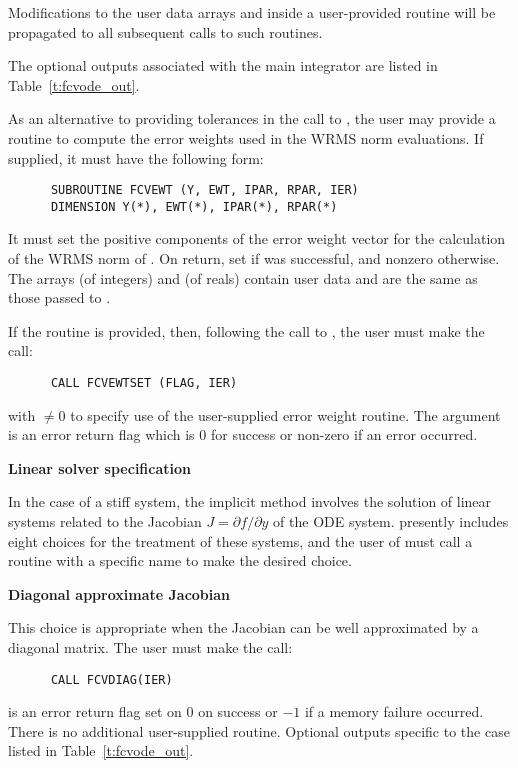 \begin{Steps}
{    Modifications to the user data arrays  and  inside a 
    user-provided routine will be propagated to all subsequent calls to
    such routines.

    The optional outputs associated with the main {\cvode} integrator
    are listed in Table~\ref{t:fcvode_out}.
  }

  As an alternative to providing tolerances in the call to , the
  user may provide a routine to compute the error weights used in the WRMS norm
  evaluations. If supplied, it must have the following form:
\begin{verbatim}
      SUBROUTINE FCVEWT (Y, EWT, IPAR, RPAR, IER)
      DIMENSION Y(*), EWT(*), IPAR(*), RPAR(*)
\end{verbatim}
  It must set the positive components of the error weight vector  for
  the calculation of the WRMS norm of . On return, set
   if  was successful, and nonzero otherwise.
  The arrays  (of integers) and  (of reals) contain user data
  and are the same as those passed to .

  If the  routine is provided, then, 
  following the call to , the user must make the call:
\begin{verbatim}
      CALL FCVEWTSET (FLAG, IER)
\end{verbatim}
  with  $\neq 0$ to specify use of the user-supplied error weight routine.
  The argument  is an error return flag which is $0$ 
  for success or non-zero if an error occurred.

\item\label{i:fcvode_lin_solv_spec} {\bf Linear solver specification} 
  
  In the case of a stiff system, the implicit  method involves the solution
  of linear systems related to the Jacobian $J = \partial f / \partial y$
  of the ODE system.  {\cvode} presently includes eight choices for the treatment
  of these systems, and the user of {\fcvode} must call a routine with a
  specific name to make the desired choice.


  {\s} {\bf Diagonal approximate Jacobian}
  
  This choice is appropriate when the Jacobian can be well approximated by
  a diagonal matrix.  The user must make the call:
\begin{verbatim}
      CALL FCVDIAG(IER)
\end{verbatim}
   is an error return flag set on $0$ on success or $-1$ if a memory 
  failure occurred.
  There is no additional user-supplied routine. Optional outputs specific
  to the {\diag} case listed in Table~\ref{t:fcvode_out}.
  

\end{Steps}
